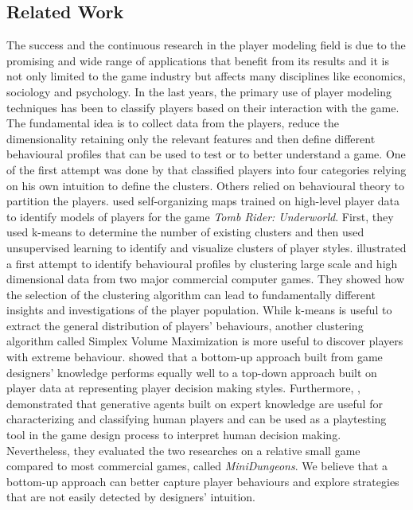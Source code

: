 \subsection{Related Work}
The success and the continuous research in the player modeling field is due to the promising and wide range of applications that benefit from its results and it is not only limited to the game industry but affects many disciplines like economics, sociology and psychology. In the last years, the primary use of player modeling techniques has been to classify players based on their interaction with the game. The fundamental idea is to collect data from the players, reduce the dimensionality retaining only the relevant features and then define different behavioural profiles that can be used to test or to better understand a game. One of the first attempt was done by \textcite{bartle_hearts_1996} that classified players into four categories relying on his own intuition to define the clusters. Others \cite{thue_interactive_2007,bateman_21st_2005} relied on behavioural theory to partition the players. \textcite{drachen_player_2009} used self-organizing maps trained on high-level player data to identify models of players for the game \textit{Tomb Rider: Underworld}. First, they used k-means to determine the number of existing clusters and then used unsupervised learning to identify and visualize clusters of player styles. \textcite{drachen_guns_2012} illustrated a first attempt to identify behavioural profiles by clustering large scale and high dimensional data from two major commercial computer games. They showed how the selection of the clustering algorithm can lead to fundamentally different insights and investigations of the player population.  While k-means is useful to extract the general distribution of players' behaviours, another clustering algorithm called Simplex Volume Maximization is more useful to discover players with extreme behaviour. \textcite{holmgard_evolving_2016} showed that a bottom-up approach built from game designers' knowledge performs equally well to a top-down approach built on player data at representing player decision making styles. Furthermore, \textcite{holmgard_generative_2014-1}, demonstrated that generative agents built on expert knowledge are useful for characterizing and classifying human players and can be used as a playtesting tool in the game design process to interpret human decision making. Nevertheless, they evaluated the two researches on a relative small game compared to most commercial games, called \textit{MiniDungeons}. We believe that a bottom-up approach can better capture player behaviours and explore strategies that are not easily detected by designers' intuition. 

